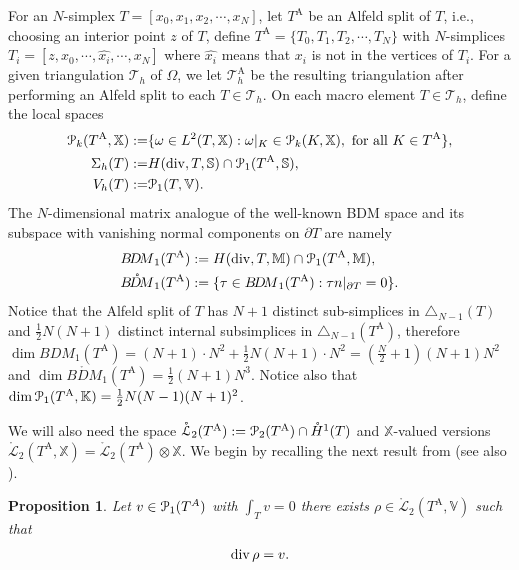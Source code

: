 \documentclass[12pt]{amsart}
\numberwithin{equation}{section}
\newtheorem{proposition}[theorem]{Proposition}
\theoremstyle{definition}
\theoremstyle{remark}
\newcommand{\V}{\mathbb{V}}
\newcommand{\M}{\mathbb{M}}
\newcommand{\X}{\mathbb{X}}
\renewcommand{\(}{\bigl(}
\renewcommand{\)}{\bigr)}
\renewcommand\div{\operatorname{div}}
\newcommand{\BDM}{{B\!D\!M}}
\newcommand{\BDMo}{\mathring{\BDM}}
\newcommand{\dive}{{\ensuremath\mathop{\mathrm{div}\,}}} %
\newcommand{\pol}{\EuScript{P}}
\newcommand{\bn}{n}
\newcommand{\Ta}{T^{\text{A}}}
\newcommand{\Tha}{\mathcal{T}_h^{\text{A}}}
\newcommand{\Th}{\mathcal{T}_h}
\newcommand{\LLo}{\mathring{\mathcal{L}}}
\begin{document}
For an $N$-simplex $T=[x_0, x_1, x_2, \cdots, x_N]$, let $\Ta$ be an
Alfeld split of $T$, i.e., choosing an interior point $z$ of $T$,
define $\Ta= \{ T_0, T_1, T_2, \cdots, T_N\}$ with $N$-simplices
$T_i=[z, x_0, \cdots, \widehat{x_i}, \cdots, x_N]$ where
$\widehat{x_i}$ means that $x_i$ is not in the vertices of $T_i$.  For
a given triangulation $\Th$ of $\Omega$, we let $\Tha$ be the
resulting triangulation after performing an Alfeld split to each
$T \in \Th$. On each macro element $T \in \Th$, define the  local spaces
\begin{alignat*}{1}
\pol_k(\Ta, \X):=&\{ \omega \in L^2(T, \X): \omega|_K \in \pol_k(K, \X), {\text{ for all }} K \in \Ta \},  \\
\Sigma_h(T):=& H(\div, T, \mathbb{S}) \cap \pol_1(\Ta, \mathbb{S}), \\
V_h(T):=&  \pol_1(T, \mathbb{V}). 
\end{alignat*}
The $N$-dimensional  matrix analogue of the well-known BDM space
and its subspace with vanishing normal components on $\partial T$ are 
  namely
  \begin{align*}
    \BDM_1(\Ta)
    &:=  H( \div, T, \M) \cap \pol_1(\Ta, \M), \\
    \BDMo_1(\Ta)
    &:= \{ \tau \in \BDM_1(\Ta): \tau \bn |_{\partial T} =0 \} .
  \end{align*}
  Notice that the Alfeld split of $T$ has $N+1$ distinct sub-simplices in $\triangle_{N-1}(T)$ and $\frac 12 N(N+1)$ distinct internal subsimplices in $\triangle_{N-1}(\Ta)$, therefore $\dim \BDM_1(\Ta) = (N+1)\cdot N^2 + \frac 12 N(N+1)\cdot N^2=(\frac N 2+1)(N+1)N^2$ and $\dim \BDMo_1(\Ta) = \frac 12 (N+1)N^3$. Notice also that $\dim \pol_1(\Ta, \mathbb{K}) = \frac 12 N(N-1)(N+1)^2$.

  We will also need the space  $\LLo_2(\Ta):= \pol_2(\Ta) \cap \mathring{H}^1(T)$ and $\X$-valued versions $\LLo_2(\Ta, \X)= \LLo_2(\Ta) \otimes \X$.
We begin by recalling   the next result  from  \cite[Theorem~3.1]{fu2018exact} (see also \cite{guzman2018inf}).
 \begin{proposition}\label{divonto}
Let $v \in \pol_1(T^A)$ with $\int_T v=0$ there exists $\rho \in \LLo_2(\Ta, \V)$ such that 
\begin{equation*}
\dive \rho=v.
  \end{equation*}
\end{proposition}
\end{document}
